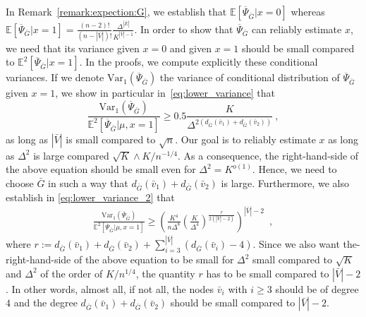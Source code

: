 \documentclass{article}
\begin{document}
 
 In Remark~\ref{remark:expection:G}, we establish that $\mathbb{E}[\overline{\Psi}_{\bar{G}}|x=0]$ whereas $\mathbb{E}[ \overline{\Psi}_{\bar{G}}|x=1]= \frac{(n-2)!}{(n-|\bar V|)!}\frac{\Delta^{|\bar{E}|}}{K^{|\bar{V}|-1}}$. In order to show that $\overline{\Psi}_{\bar{G}}$ can reliably estimate $x$, we need that its variance  given $x=0$ and given $x=1$ should be small compared to $\mathbb{E}^2[ \overline{\Psi}_{\bar{G}}|x=1]$. In the proofs, we compute explicitly these conditional variances. If we denote  $\mathrm{Var}_1(\overline{\Psi}_{\bar{G}})$ the variance of conditional distribution of $\overline{\Psi}_{\bar{G}}$ given $x=1$, we show in particular in~\eqref{eq:lower_variance} that 
\[
\frac{\mathrm{Var}_1(\overline{\Psi}_{\bar{G}})}{\mathbb E^2[\overline{\Psi}_{\bar{G}}|\mu,x=1]} \geq 0.5 \frac{K}{\Delta^{2(d_{\bar{G}}(\bar v_1)+d_{\bar{G}}(\bar v_2))}}\ , 
\]
as long  as $|\bar{V}|$ is small compared to $\sqrt{n}$. Our goal is to reliably estimate $x$ as long as $\Delta^2$ is large compared $\sqrt{K}\wedge K/n^{-1/4}$. As a consequence, the right-hand-side of the above equation should be small even for $\Delta^2=K^{o(1)}$.  Hence, we need to choose $\bar{G}$ in such a way that $d_{\bar{G}}(\bar v_1)+d_{\bar{G}}(\bar v_2)$ is large. Furthermore, we also establish in \eqref{eq:lower_variance_2} that 
\begin{align} 
\frac{\mathrm{Var}_1(\overline{\Psi}_{\bar{G}})}{\mathbb E^2[\overline{\Psi}_{\bar{G}}|\mu,x=1]} \geq  \left(\frac{K^4}{n\Delta^8}\left(\frac{K}{\Delta^4}\right)^{\frac{r}{2(|\bar{V}|-2)}}\right)^{|\bar{V}|-2}  \enspace ,  
\end{align}
where $r := d_{\bar{G}}(\bar v_1)+d_{\bar{G}}(\bar v_2)+ \sum_{i=3}^{|\bar{V}|}(d_{\bar{G}}(\bar v_i)-4)$. Since we also want the-right-hand-side of the above equation to be small  
 for $\Delta^2$ small compared to $\sqrt{K}$ and $\Delta^2$ of the order of $K/n^{1/4}$,  the quantity $r$ has to be small compared to $|\bar{V}|-2$. In other words, almost all, if not all, the nodes $\bar{v}_i$ with $i\geq 3$ should be of degree $4$ and the degree $d_{\bar{G}}(\bar v_1)+d_{\bar{G}}(\bar v_2)$ should be small compared to $|\bar{V}|-2$.





 \medskip 
\end{document}
